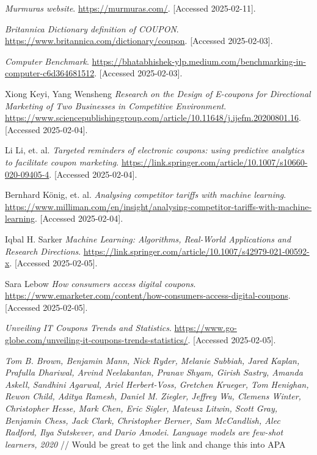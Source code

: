 \documentclass[licencjacka,en]{pracamgr}
\begin{document}

\textit{Murmuras website}.
\url{https://murmuras.com/}.
[Accessed 2025-02-11].

\textit{Britannica Dictionary definition of COUPON}.
\url{https://www.britannica.com/dictionary/coupon}.
[Accessed 2025-02-03].

\textit{Computer Benchmark}.
\url{https://bhatabhishek-ylp.medium.com/benchmarking-in-computer-c6d364681512}.
[Accessed 2025-02-03].

Xiong Keyi, Yang Wensheng
\textit{Research on the Design of E-coupons for Directional Marketing of Two Businesses in Competitive Environment}.
\url{https://www.sciencepublishinggroup.com/article/10.11648/j.ijefm.20200801.16}.
[Accessed 2025-02-04].

Li Li, et. al.
\textit{Targeted reminders of electronic coupons: using predictive analytics to facilitate coupon marketing}.
\url{https://link.springer.com/article/10.1007/s10660-020-09405-4}.
[Accessed 2025-02-04].

Bernhard König, et. al.
\textit{Analysing competitor tariffs with machine learning}.
\url{https://www.milliman.com/en/insight/analysing-competitor-tariffs-with-machine-learning}.
[Accessed 2025-02-04].

Iqbal H. Sarker
\textit{Machine Learning: Algorithms, Real-World Applications and Research Directions}.
\url{https://link.springer.com/article/10.1007/s42979-021-00592-x}.
[Accessed 2025-02-05].

Sara Lebow
\textit{How consumers access digital coupons}.
\url{https://www.emarketer.com/content/how-consumers-access-digital-coupons}.
[Accessed 2025-02-05].

\textit{Unveiling IT Coupons Trends and Statistics}.
\url{https://www.go-globe.com/unveiling-it-coupons-trends-statistics/}.
[Accessed 2025-02-05].

\textit{Tom B. Brown, Benjamin Mann, Nick Ryder, Melanie Subbiah, Jared
Kaplan, Prafulla Dhariwal, Arvind Neelakantan, Pranav Shyam, Girish
Sastry, Amanda Askell, Sandhini Agarwal, Ariel Herbert-Voss, Gretchen
Krueger, Tom Henighan, Rewon Child, Aditya Ramesh, Daniel M.
Ziegler, Jeffrey Wu, Clemens Winter, Christopher Hesse, Mark Chen,
Eric Sigler, Mateusz Litwin, Scott Gray, Benjamin Chess, Jack Clark,
Christopher Berner, Sam McCandlish, Alec Radford, Ilya Sutskever, and
Dario Amodei. Language models are few-shot learners, 2020}
// Would be great to get the link and change this into APA
\end{document}
